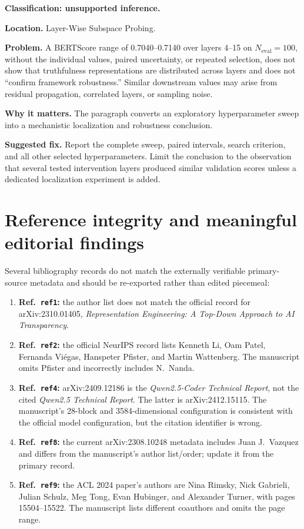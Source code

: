 \documentclass[11pt]{article}
\begin{document}
\textbf{Classification: unsupported inference.}

\textbf{Location.} Layer-Wise Subspace Probing.

\textbf{Problem.} A BERTScore range of 0.7040--0.7140 over layers 4--15 on $N_{\text{eval}}=100$, without the individual values, paired uncertainty, or repeated selection, does not show that truthfulness representations are distributed across layers and does not ``confirm framework robustness.''  Similar downstream values may arise from residual propagation, correlated layers, or sampling noise.

\textbf{Why it matters.} The paragraph converts an exploratory hyperparameter sweep into a mechanistic localization and robustness conclusion.

\textbf{Suggested fix.} Report the complete sweep, paired intervals, search criterion, and all other selected hyperparameters.  Limit the conclusion to the observation that several tested intervention layers produced similar validation scores unless a dedicated localization experiment is added.

\section*{Reference integrity and meaningful editorial findings}

Several bibliography records do not match the externally verifiable primary-source metadata and should be re-exported rather than edited piecemeal:

\begin{enumerate}
 \item \textbf{Ref.~\texttt{ref1}:} the author list does not match the official record for arXiv:2310.01405, \emph{Representation Engineering: A Top-Down Approach to AI Transparency}.
 \item \textbf{Ref.~\texttt{ref2}:} the official NeurIPS record lists Kenneth Li, Oam Patel, Fernanda Vi\'egas, Hanspeter Pfister, and Martin Wattenberg.  The manuscript omits Pfister and incorrectly includes N.~Nanda.
 \item \textbf{Ref.~\texttt{ref4}:} arXiv:2409.12186 is the \emph{Qwen2.5-Coder Technical Report}, not the cited \emph{Qwen2.5 Technical Report}.  The latter is arXiv:2412.15115.  The manuscript's 28-block and 3584-dimensional configuration is consistent with the official model configuration, but the citation identifier is wrong.
 \item \textbf{Ref.~\texttt{ref8}:} the current arXiv:2308.10248 metadata includes Juan J.~Vazquez and differs from the manuscript's author list/order; update it from the primary record.
 \item \textbf{Ref.~\texttt{ref9}:} the ACL 2024 paper's authors are Nina Rimsky, Nick Gabrieli, Julian Schulz, Meg Tong, Evan Hubinger, and Alexander Turner, with pages 15504--15522.  The manuscript lists different coauthors and omits the page range.
\end{enumerate}
\end{document}
